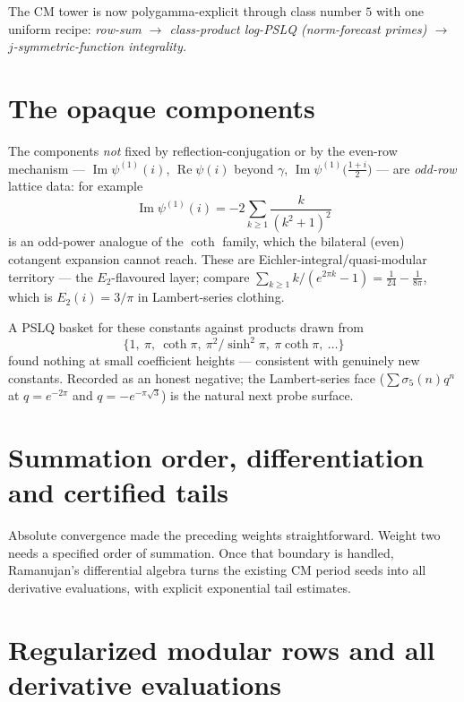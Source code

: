 The CM tower is now polygamma-explicit through class number $5$ with one uniform recipe:
\emph{row-sum $\to$ class-product log-PSLQ (norm-forecast primes) $\to$
$j$-symmetric-function integrality.}





\section{The opaque components}\label{cm:sec:opaque}

The components \emph{not} fixed by reflection-conjugation or by the even-row mechanism ---
$\operatorname{Im}\psi^{(1)}(i)$, $\operatorname{Re}\psi(i)$ beyond $\gamma$,
$\operatorname{Im}\psi^{(1)}\bigl(\tfrac{1+i}{2}\bigr)$ --- are \emph{odd-row} lattice data:
for example
\[
\operatorname{Im}\psi^{(1)}(i)=-2\sum_{k\ge1}\frac{k}{(k^2+1)^2}
\]
is an odd-power analogue of the $\coth$ family, which the bilateral (even) cotangent
expansion cannot reach. These are Eichler-integral/quasi-modular territory --- the
$E_2$-flavoured layer; compare $\sum_{k\ge1}k/(e^{2\pi k}-1)=\tfrac1{24}-\tfrac1{8\pi}$,
which is $E_2(i)=3/\pi$ in Lambert-series clothing.

\begin{negative}\label{cm:neg:opaque}
A PSLQ basket for these constants against products drawn from
\[
\{1,\ \pi,\ \coth\pi,\ \pi^2/\sinh^2\pi,\ \pi\coth\pi,\ \dots\}
\]
found nothing at small coefficient heights --- consistent with genuinely new constants.
Recorded as an honest negative; the Lambert-series face ($\sum\sigma_5(n)q^n$ at
$q=e^{-2\pi}$ and $q=-e^{-\pi\sqrt3}$) is the natural next probe surface.
\end{negative}

\section{Summation order, differentiation and certified tails}
Absolute convergence made the preceding weights straightforward. Weight
two needs a specified order of summation. Once that boundary is handled,
Ramanujan's differential algebra turns the existing CM period seeds into
all derivative evaluations, with explicit exponential tail estimates.

\section{Regularized modular rows and all derivative evaluations}
\label{modular:sec:modular}

